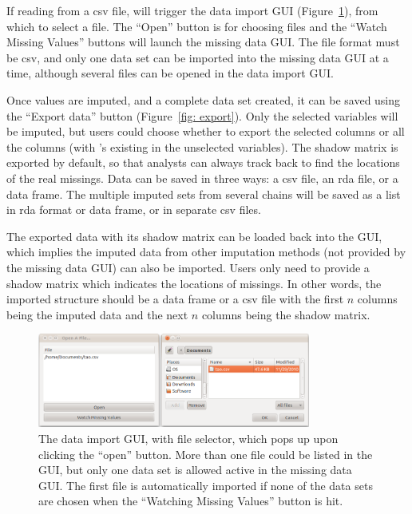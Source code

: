 \documentclass[article]{jss}
\begin{document}
If reading from a csv file,  will trigger
the data import GUI (Figure~\ref{fig: import}), from which to
select a file. The ``Open'' button is for choosing files and
the ``Watch Missing Values'' buttons will launch the missing
data GUI. The file format must be csv, and only one data set
can be imported into the missing data GUI at a time, although
several files can be opened in the data import GUI.

Once values are imputed, and a complete data set created, it can
be saved using the ``Export data'' button (Figure~\ref{fig: export}).
Only the selected variables will be imputed, but users could
choose whether to export the selected columns or all the columns
(with 's existing in the unselected variables). The shadow
matrix is exported by default, so that analysts can always track
back to find the locations of the real missings. Data can be saved
in three ways: a csv file, an rda file, or a data frame. The
multiple imputed sets from several chains will be saved as a list
in rda format or data frame, or in separate csv files.

The exported data with its shadow matrix can be loaded back
into the GUI, which implies the imputed data from other
imputation methods (not provided by the missing data GUI)
can also be imported. Users only need to provide a shadow
matrix which indicates the locations of missings. In other
words, the imported structure should be a data frame or a csv
file with the first $n$ columns being the imputed data and
the next $n$ columns being the shadow matrix.

\begin{center}
\begin{figure}[!h]
\begin{centering}
\includegraphics[width=0.8\textwidth]{graph/fig6-open}
\par\end{centering}
\caption{The data import GUI, with file selector, which pops
up upon clicking the ``open'' button. More than one file
could be listed in the GUI, but only one data set is allowed
active in the missing data GUI. The first file is automatically
imported if none of the data sets are chosen when the
``Watching Missing Values'' button is hit.}
\label{fig: import}
\end{figure}
\par\end{center}
\end{document}
